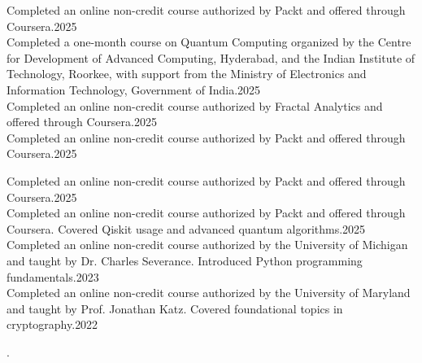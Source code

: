 \documentclass[
	a4paper,
	sidecolor=gray!50,
	sectioncolor=materialblue,
	subsectioncolor=materialindigo,
	profilepicsize=3.5cm,
	profilepicstyle=profilecircle,
	profilepiczoom=1.1,
]{sixtysecondscv}
\begin{document}
\vspace{2mm}
\begin{cvtable}

{Completed an online non-credit course authorized by Packt and offered through Coursera.}{2025}\\


{Completed a one-month course on Quantum Computing organized by the Centre for Development of Advanced Computing, Hyderabad, and the Indian Institute of Technology, Roorkee, with support from the Ministry of Electronics and Information Technology, Government of India.}{2025}\\

{Completed an online non-credit course authorized by Fractal Analytics and offered through Coursera.}{2025}\\

{Completed an online non-credit course authorized by Packt and offered through Coursera.}{2025}\\
\end{cvtable}
\begin{cvtable}
{Completed an online non-credit course authorized by Packt and offered through Coursera.}{2025}\\

{Completed an online non-credit course authorized by Packt and offered through Coursera. Covered Qiskit usage and advanced quantum algorithms.}{2025}\\

{Completed an online non-credit course authorized by the University of Michigan and taught by Dr. Charles Severance. Introduced Python programming fundamentals.}{2023}\\

{Completed an online non-credit course authorized by the University of Maryland and taught by Prof. Jonathan Katz. Covered foundational topics in cryptography.}{2022}\\

\end{cvtable}

\cvsignature  \watermark.
\end{document}
